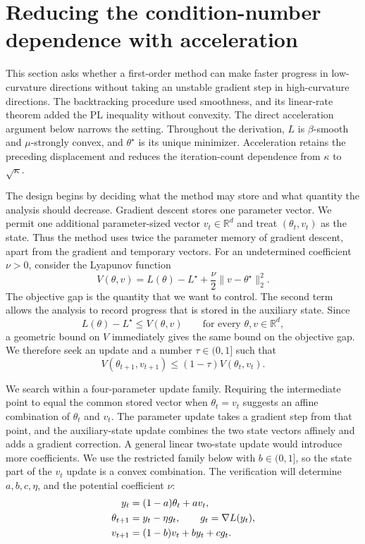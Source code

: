 \documentclass[11pt,twoside]{article}
\newcommand{\R}{\mathbb R}
\theoremstyle{definition}
\theoremstyle{remark}
\begin{document}
\section{Reducing the condition-number dependence with acceleration}
\label{sec:acceleration}

This section asks whether a first-order method can make faster progress in
low-curvature directions without taking an unstable gradient step in
high-curvature directions. The backtracking procedure used smoothness, and its
linear-rate theorem added the PL inequality without convexity. The direct
acceleration argument below narrows the setting.
Throughout the derivation, $L$ is $\beta$-smooth and $\mu$-strongly convex,
and $\theta^\star$ is its unique minimizer. Acceleration retains the preceding
displacement and reduces the iteration-count dependence from $\kappa$ to
$\sqrt\kappa$.

The design begins by deciding what the method may store and what quantity the
analysis should decrease. Gradient descent stores one parameter vector. We
permit one additional parameter-sized vector $v_t\in\R^d$ and treat
$(\theta_t,v_t)$ as the state. Thus the method uses twice the parameter
memory of gradient descent, apart from the gradient and temporary vectors.
For an undetermined coefficient $\nu>0$, consider the Lyapunov function
\begin{equation}
 V(\theta,v)
 =L(\theta)-L^\star+\frac\nu2\|v-\theta^\star\|_2^2.
 \label{eq:accelerated-design-potential}
\end{equation}
The objective gap is the quantity that we want to control. The second term
allows the analysis to record progress that is stored in the auxiliary
state. Since
\begin{equation}
 L(\theta)-L^\star\le V(\theta,v)
 \qquad\text{for every }\theta,v\in\R^d,
 \label{eq:accelerated-potential-dominates-gap}
\end{equation}
a geometric bound on $V$ immediately gives the same bound on the
objective gap. We therefore seek an update and a number $\tau\in(0,1]$ such
that
\begin{equation}
 V(\theta_{t+1},v_{t+1})
 \le(1-\tau)V(\theta_t,v_t).
 \label{eq:accelerated-design-target}
\end{equation}

We search within a four-parameter update family. Requiring the intermediate
point to equal the common stored vector when $\theta_t=v_t$ suggests an affine
combination of $\theta_t$ and $v_t$. The parameter update takes a gradient step
from that point, and the auxiliary-state update combines the two state vectors
affinely and adds a gradient correction. A general linear two-state update
would introduce more coefficients. We use the restricted family below with
$b\in(0,1]$, so the state part of the $v_t$ update is a convex combination.
The verification will determine $a,b,c,\eta$, and the potential coefficient
$\nu$:
\begin{align}
 y_t&=(1-a)\theta_t+a v_t,\notag\\
 \theta_{t+1}&=y_t-\eta g_t,\qquad g_t=\nabla L(y_t),\notag\\
 v_{t+1}&=(1-b)v_t+b y_t+c g_t.
 \label{eq:accelerated-affine-search}
\end{align}
\end{document}
